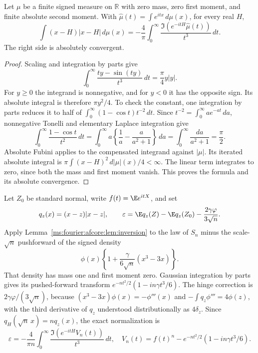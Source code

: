 \begin{lemma}\label{ms:fourier:afcore:lem:inversion}
Let $\mu$ be a finite signed measure on $\mathbb R$ with zero mass,
zero first moment, and finite absolute second moment. With
$\widehat\mu(t)=\int e^{itx}\,d\mu(x)$, for every real $H$,
\begin{equation}\label{ms:fourier:afcore:eq:inversion}
 \int(x-H)|x-H|\,d\mu(x)
 =-\frac4\pi\int_0^\infty
        \frac{\Im(e^{-itH}\widehat\mu(t))}{t^3}\,dt.
\end{equation}
The right side is absolutely convergent.
\end{lemma}
\begin{proof}
Scaling and integration by parts give
\[
 \int_0^\infty\frac{ty-\sin(ty)}{t^3}\,dt
 =\frac\pi4 y|y|.
\]
For $y\ge0$ the integrand is nonnegative, and for $y<0$ it has the
opposite sign. Its absolute integral is therefore $\pi y^2/4$.
To check the constant, one integration by parts reduces it to half of
$\int_0^\infty(1-\cos t)t^{-2}\,dt$. Since
$t^{-2}=\int_0^\infty a e^{-at}\,da$, nonnegative Tonelli and elementary
Laplace integration give
\[
 \int_0^\infty\frac{1-\cos t}{t^2}\,dt
 =\int_0^\infty a\left\{\frac1a-\frac a{a^2+1}\right\}\,da
 =\int_0^\infty\frac{da}{a^2+1}=\frac\pi2.
\]
Absolute Fubini applies to the compensated integrand against $|\mu|$.
Its iterated absolute integral is
$\pi\int(x-H)^2\,d|\mu|(x)/4<\infty$.
The linear term integrates to zero, since both the mass and first moment
vanish. This proves the formula and its absolute convergence.
\end{proof}

Let $Z_0$ be standard normal, write $f(t)=\E e^{itX}$, and set
\[
 q_z(x)=(x-z)|x-z|,\qquad
 \varepsilon=\E q_z(Z)-\E q_z(Z_0)-\frac{2\gamma\varphi}{3\sqrt n}.
\]
Apply Lemma~\ref{ms:fourier:afcore:lem:inversion} to the law of $S_n$ minus the
scale-$\sqrt n$ pushforward of the signed density
\[
 \phi(x)\left\{1+\frac{\gamma}{6\sqrt n}(x^3-3x)\right\}.
\]
That density has mass one and first moment zero. Gaussian integration
by parts gives its pushed-forward transform
$e^{-nt^2/2}(1-in\gamma t^3/6)$.
The hinge correction is $2\gamma\varphi/(3\sqrt n)$, because
$(x^3-3x)\phi(x)=-\phi'''(x)$ and
$-\int q_z\phi'''=4\phi(z)$, with the third derivative of $q_z$
understood distributionally as $4\delta_z$.
Since $q_H(\sqrt n\,x)=nq_z(x)$, the exact normalization is
\begin{equation}\label{ms:fourier:afcore:eq:epsilon}
 \varepsilon=-\frac4{\pi n}\int_0^\infty
        \frac{\Im(e^{-itH}V_n(t))}{t^3}\,dt,
 \quad V_n(t)=f(t)^n-e^{-nt^2/2}(1-in\gamma t^3/6).
\end{equation}

